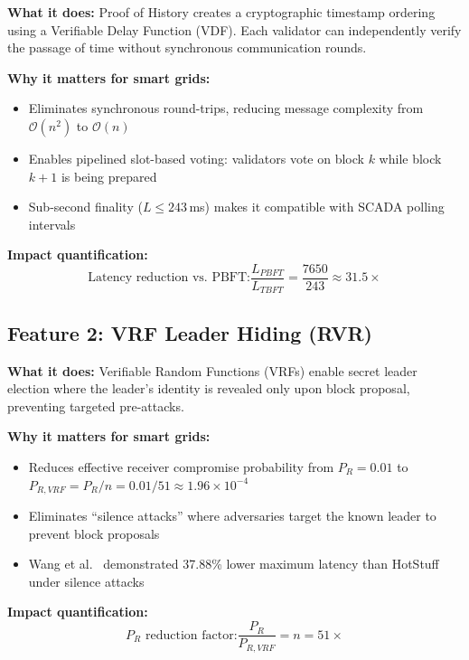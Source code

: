 \documentclass[10pt,twocolumn,letterpaper]{article}
\begin{document}
\textbf{What it does:} Proof of History creates a cryptographic timestamp ordering using a Verifiable Delay Function (VDF). Each validator can independently verify the passage of time without synchronous communication rounds.

\textbf{Why it matters for smart grids:}
\begin{itemize}[leftmargin=*]
    \item Eliminates synchronous round-trips, reducing message complexity from $\mathcal{O}(n^2)$ to $\mathcal{O}(n)$
    \item Enables pipelined slot-based voting: validators vote on block $k$ while block $k+1$ is being prepared
    \item Sub-second finality ($L \leq 243$\,ms) makes it compatible with SCADA polling intervals
\end{itemize}

\textbf{Impact quantification:}
\begin{equation}
\text{Latency reduction vs.\ PBFT:} \frac{L_{PBFT}}{L_{TBFT}} = \frac{7650}{243} \approx 31.5\times
\end{equation}

\subsection{Feature 2: VRF Leader Hiding (RVR)}

\textbf{What it does:} Verifiable Random Functions (VRFs) enable secret leader election where the leader's identity is revealed only upon block proposal, preventing targeted pre-attacks.

\textbf{Why it matters for smart grids:}
\begin{itemize}[leftmargin=*]
    \item Reduces effective receiver compromise probability from $P_R = 0.01$ to $P_{R,VRF} = P_R/n = 0.01/51 \approx 1.96 \times 10^{-4}$
    \item Eliminates ``silence attacks'' where adversaries target the known leader to prevent block proposals
    \item Wang et al.~\cite{wang2025} demonstrated 37.88\% lower maximum latency than HotStuff under silence attacks
\end{itemize}

\textbf{Impact quantification:}
\begin{equation}
\text{$P_R$ reduction factor:} \frac{P_R}{P_{R,VRF}} = n = 51\times
\end{equation}
\end{document}
